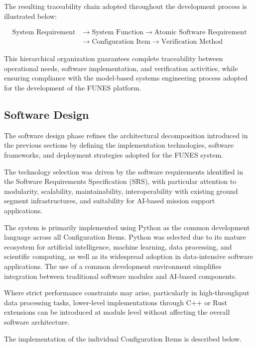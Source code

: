 The resulting traceability chain adopted throughout the development process is illustrated below:

\[
\begin{aligned}
\text{System Requirement}
&\rightarrow
\text{System Function}
\rightarrow
\text{Atomic Software Requirement} \\
&\rightarrow
\text{Configuration Item}
\rightarrow
\text{Verification Method}
\end{aligned}
\]

This hierarchical organization guarantees complete traceability between operational needs, software implementation, and verification activities, while ensuring compliance with the model-based systems engineering process adopted for the development of the FUNES platform.



\subsection{Software Design}


The software design phase refines the architectural decomposition introduced in the previous sections by defining the implementation technologies, software frameworks, and deployment strategies adopted for the FUNES system.

The technology selection was driven by the software requirements identified in the Software Requirements Specification (SRS), with particular attention to modularity, scalability, maintainability, interoperability with existing ground segment infrastructures, and suitability for AI-based mission support applications.

The system is primarily implemented using Python as the common development language across all Configuration Items. Python was selected due to its mature ecosystem for artificial intelligence, machine learning, data processing, and scientific computing, as well as its widespread adoption in data-intensive software applications. The use of a common development environment simplifies integration between traditional software modules and AI-based components.

Where strict performance constraints may arise, particularly in high-throughput data processing tasks, lower-level implementations through C++ or Rust extensions can be introduced at module level without affecting the overall software architecture.

The implementation of the individual Configuration Items is described below.

